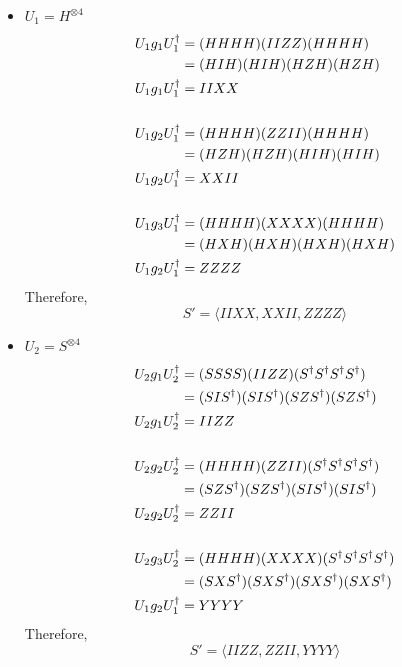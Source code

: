 \begin{itemize}
    \item $U_1 = H^{\otimes 4}$ 
    \begin{align}
        U_1g_1U_1^\dagger &= (HHHH)(IIZZ)(HHHH) \\
        &= (HIH)(HIH)(HZH)(HZH) \\
        U_1g_1U_1^\dagger & = IIXX \\
        &\notag \\
        U_1g_2U_1^\dagger &= (HHHH)(ZZII)(HHHH) \\
        &= (HZH)(HZH)(HIH)(HIH) \\
        U_1g_2U_1^\dagger & = XXII \\
        &\notag \\
        U_1g_3U_1^\dagger &= (HHHH)(XXXX)(HHHH) \\
        &= (HXH)(HXH)(HXH)(HXH) \\
        U_1g_2U_1^\dagger & = ZZZZ 
    \end{align}
    Therefore,
    \begin{equation}
        \boxed{S' = \langle IIXX, XXII,ZZZZ \rangle}
    \end{equation}
    
    \item $U_2 = S^{\otimes 4}$
    \begin{align}
        U_2g_1U_2^\dagger &= (SSSS)(IIZZ)(S^\dagger S^\dagger S^\dagger S^\dagger ) \\
        &= (SIS^\dagger)(SIS^\dagger)(SZS^\dagger)(SZS^\dagger) \\
        U_2g_1U_2^\dagger & = IIZZ \\
        &\notag \\
        U_2g_2U_2^\dagger &= (HHHH)(ZZII)(S^\dagger S^\dagger S^\dagger S^\dagger) \\
        &= (SZS^\dagger)(SZS^\dagger)(SIS^\dagger)(SIS^\dagger) \\
        U_2g_2U_2^\dagger & = ZZII \\
        &\notag \\
        U_2g_3U_2^\dagger &= (HHHH)(XXXX)(S^\dagger S^\dagger S^\dagger S^\dagger) \\
        &= (SXS^\dagger)(SXS^\dagger)(SXS^\dagger)(SXS^\dagger) \\
        U_1g_2U_1^\dagger & = YYYY 
    \end{align}
    Therefore,
    \begin{equation}
        \boxed{S' = \langle IIZZ, ZZII, YYYY \rangle}
    \end{equation}
    

\end{itemize}
